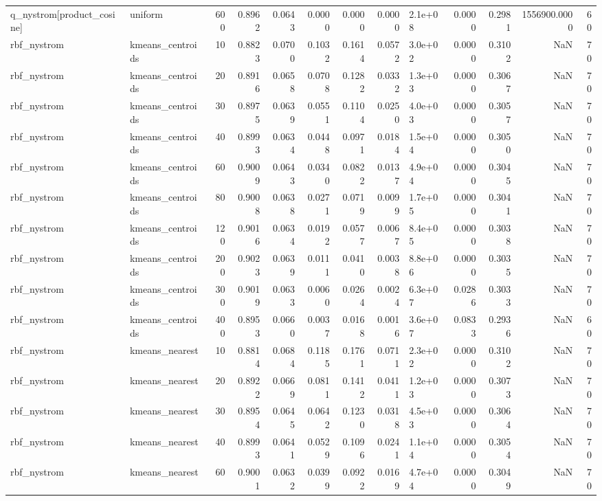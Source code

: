 \begin{table}
\begin{tabular}{llrrrrrrlrrrr}
q\_nystrom[product\_cosine] & uniform & 600 & 0.8962 & 0.0643 & 0.0000 & 0.0000 & 0.0000 & 2.1e+08 & 0.0000 & 0.2981 & 1556900.0000 & 60 \\
rbf\_nystrom & kmeans\_centroids & 10 & 0.8823 & 0.0700 & 0.1032 & 0.1614 & 0.0572 & 3.0e+02 & 0.0000 & 0.3102 & NaN & 70 \\
rbf\_nystrom & kmeans\_centroids & 20 & 0.8916 & 0.0658 & 0.0708 & 0.1282 & 0.0332 & 1.3e+03 & 0.0000 & 0.3067 & NaN & 70 \\
rbf\_nystrom & kmeans\_centroids & 30 & 0.8975 & 0.0639 & 0.0551 & 0.1104 & 0.0250 & 4.0e+03 & 0.0000 & 0.3057 & NaN & 70 \\
rbf\_nystrom & kmeans\_centroids & 40 & 0.8993 & 0.0634 & 0.0448 & 0.0971 & 0.0184 & 1.5e+04 & 0.0000 & 0.3050 & NaN & 70 \\
rbf\_nystrom & kmeans\_centroids & 60 & 0.9009 & 0.0643 & 0.0340 & 0.0822 & 0.0137 & 4.9e+04 & 0.0000 & 0.3045 & NaN & 70 \\
rbf\_nystrom & kmeans\_centroids & 80 & 0.9008 & 0.0638 & 0.0271 & 0.0719 & 0.0099 & 1.7e+05 & 0.0000 & 0.3041 & NaN & 70 \\
rbf\_nystrom & kmeans\_centroids & 120 & 0.9016 & 0.0634 & 0.0192 & 0.0577 & 0.0067 & 8.4e+05 & 0.0000 & 0.3038 & NaN & 70 \\
rbf\_nystrom & kmeans\_centroids & 200 & 0.9023 & 0.0639 & 0.0111 & 0.0410 & 0.0038 & 8.8e+06 & 0.0000 & 0.3035 & NaN & 70 \\
rbf\_nystrom & kmeans\_centroids & 300 & 0.9019 & 0.0633 & 0.0060 & 0.0264 & 0.0024 & 6.3e+07 & 0.0286 & 0.3033 & NaN & 70 \\
rbf\_nystrom & kmeans\_centroids & 400 & 0.8953 & 0.0660 & 0.0037 & 0.0168 & 0.0016 & 3.6e+07 & 0.0833 & 0.2936 & NaN & 60 \\
rbf\_nystrom & kmeans\_nearest & 10 & 0.8814 & 0.0684 & 0.1185 & 0.1761 & 0.0711 & 2.3e+02 & 0.0000 & 0.3102 & NaN & 70 \\
rbf\_nystrom & kmeans\_nearest & 20 & 0.8922 & 0.0669 & 0.0811 & 0.1412 & 0.0411 & 1.2e+03 & 0.0000 & 0.3073 & NaN & 70 \\
rbf\_nystrom & kmeans\_nearest & 30 & 0.8954 & 0.0645 & 0.0642 & 0.1230 & 0.0318 & 4.5e+03 & 0.0000 & 0.3064 & NaN & 70 \\
rbf\_nystrom & kmeans\_nearest & 40 & 0.8993 & 0.0641 & 0.0529 & 0.1096 & 0.0241 & 1.1e+04 & 0.0000 & 0.3054 & NaN & 70 \\
rbf\_nystrom & kmeans\_nearest & 60 & 0.9001 & 0.0632 & 0.0399 & 0.0922 & 0.0169 & 4.7e+04 & 0.0000 & 0.3049 & NaN & 70 \\

\end{tabular}
\end{table}
